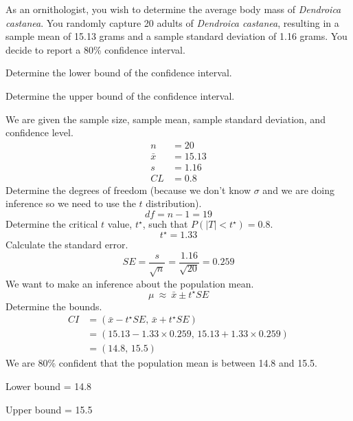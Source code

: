 
\begin{question}
As an ornithologist, you wish to determine the average body mass of
\emph{Dendroica castanea}. You randomly capture 20 adults of
\emph{Dendroica castanea}, resulting in a sample mean of 15.13 grams and
a sample standard deviation of 1.16 grams. You decide to report a 80\%
confidence interval.
\begin{answerlist}
  \item Determine the lower bound of the confidence interval.
  \item Determine the upper bound of the confidence interval.
\end{answerlist}
\end{question}

\begin{solution}
We are given the sample size, sample mean, sample standard deviation,
and confidence level. \[
\begin{aligned}
n &= 20 \\
\bar{x} &= 15.13 \\
s &= 1.16\\
CL &= 0.8
\end{aligned}
\] Determine the degrees of freedom (because we don't know \(\sigma\)
and we are doing inference so we need to use the \(t\) distribution).
\[df = n-1 = 19\] Determine the critical \(t\) value, \(t^\star\), such
that \(P(|T|<t^\star) = 0.8\). \[t^\star = 1.33 \] Calculate the
standard error.
\[ SE = \frac{s}{\sqrt{n}} = \frac{1.16}{\sqrt{20}} = 0.259 \] We want
to make an inference about the population mean.
\[\mu ~\approx~ \bar{x}\pm t^\star SE \] Determine the bounds. \[
\begin{aligned}
CI &= (\bar{x} - t^\star SE,\,\bar{x} + t^\star SE) \\
   &= (15.13 - 1.33\times0.259,\,15.13 + 1.33\times0.259) \\
   &= (14.8,\,15.5) 
\end{aligned}
\] We are 80\% confident that the population mean is between 14.8 and
15.5.
\begin{answerlist}
  \item Lower bound = 14.8
  \item Upper bound = 15.5
\end{answerlist}
\end{solution}

